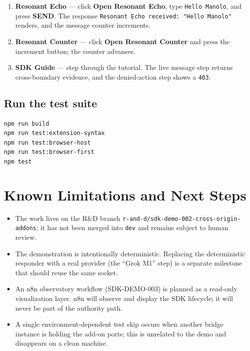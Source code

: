 \documentclass[11pt]{article}
\begin{document}
\begin{enumerate}[leftmargin=1.5em]
  \item \textbf{Resonant Echo} --- click \textbf{Open Resonant Echo}, type
        \texttt{Hello Manolo}, and press \textbf{SEND}. The response
        \texttt{Resonant Echo received: "Hello Manolo"} renders, and the
        message counter increments.
  \item \textbf{Resonant Counter} --- click \textbf{Open Resonant Counter} and
        press the increment button; the counter advances.
  \item \textbf{SDK Guide} --- step through the tutorial. The live message step
        returns cross-boundary evidence, and the denied-action step shows a
        \texttt{403}.
\end{enumerate}

\subsection{Run the test suite}

\begin{lstlisting}[language=bash]
npm run build
npm run test:extension-syntax
npm run test:browser-host
npm run test:browser-first
npm test
\end{lstlisting}

\section{Known Limitations and Next Steps}

\begin{itemize}[leftmargin=1.5em]
  \item The work lives on the R\&D branch
        \texttt{r-and-d/sdk-demo-002-cross-origin-addons}; it has not been
        merged into \texttt{dev} and remains subject to human review.
  \item The demonstration is intentionally deterministic. Replacing the
        deterministic responder with a real provider (the ``Grok M1'' step) is a
        separate milestone that should reuse the same socket.
  \item An n8n observatory workflow (\textsc{SDK-DEMO-003}) is planned as a
        read-only visualization layer. n8n will observe and display the SDK
        lifecycle; it will never be part of the authority path.
  \item A single environment-dependent test skip occurs when another bridge
        instance is holding the add-on ports; this is unrelated to the demo and
        disappears on a clean machine.
\end{itemize}
\end{document}
